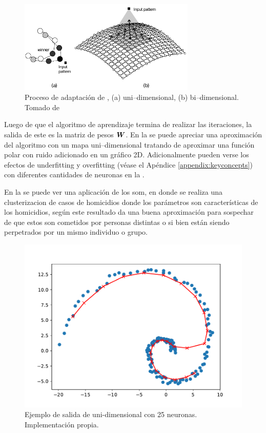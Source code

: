 \begin{figure}[H]
\centering
\includegraphics[width=0.75\textwidth]{Figures/som-adaptive-proc.pdf}
\decoRule
\caption[Proceso de adaptación de ]{Proceso de adaptación de , (a) uni--dimensional, (b) bi--dimensional. Tomado de \cite{de2006fundamentals}}
\label{fig:som-adap-proc}
\end{figure}

Luego de que el algoritmo de aprendizaje termina de realizar las iteraciones, la salida de este es la matriz de pesos ${\bm{W}}$. En la  se puede apreciar una aproximación del algoritmo con un mapa uni--dimensional tratando de aproximar una función polar con ruido adicionado en un gráfico 2D. Adicionalmente pueden verse los efectos de \gls{underfitting} y \gls{overfitting} (véase el Apéndice \ref{appendix:keyconcepts}) con diferentes cantidades de neuronas en la .

En la  se puede ver una aplicación de los \gls{som}, en donde se realiza una clusterizacion de casos de homicidios donde los parámetros son características de los homicidios, según \cite{mena2003investigative} este resultado da una buena aproximación para sospechar de que estos son cometidos por personas distintas o si bien están siendo perpetrados por un mismo individuo o grupo.

\begin{figure}[H]
\centering
\includegraphics[width=\textwidth]{Figures/som-implementation-example25.pdf}
\decoRule
\caption[Ejemplo de salida de  uni-dimensional]{Ejemplo de salida de  uni-dimensional con 25 neuronas. Implementación propia.}
\label{fig:som-impl-example}
\end{figure}

